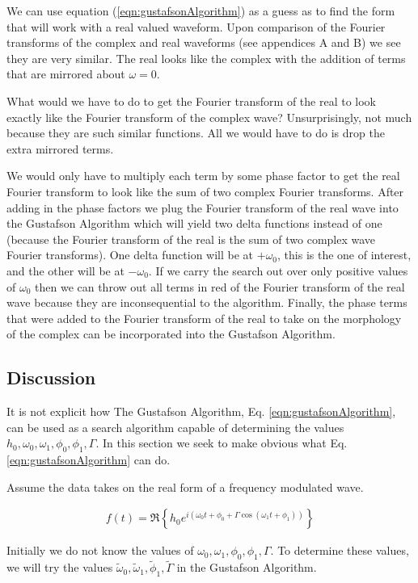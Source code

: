 \documentclass[onecolumn, groupedaddress, 10pt]{revtex4-1}
\begin{document}
We can use equation (\ref{eqn:gustafsonAlgorithm}) as a guess as to find the form that will work with a real valued waveform.  Upon comparison of the Fourier transforms of the complex and real waveforms (see appendices A and B) we see they are very similar.  The real looks like the complex with the addition of terms that are mirrored about $\omega=0$.

What would we have to do to get the Fourier transform of the real to look exactly like the Fourier transform of the complex wave?  Unsurprisingly, not much because they are such similar functions.  All we would have to do is drop the extra mirrored terms.


We would only have to multiply each term by some phase factor to get the real Fourier transform to look like the sum of two complex Fourier transforms.  After adding in the phase factors we plug the Fourier transform of the real wave into the Gustafson Algorithm which will yield two delta functions instead of one (because the Fourier transform of the real is the sum of two complex wave Fourier transforms).  One delta function will be at $+\omega_0$, this is the one of interest, and the other will be at $-\omega_0$. If we carry the search out over only positive values of $\omega_0$ then we can throw out all terms in red of the Fourier transform of the real wave because they are inconsequential to the algorithm.  Finally, the phase terms that were added to the Fourier transform of the real to take on the morphology of the complex can be incorporated into the Gustafson Algorithm.


\subsection{Discussion}
It is not explicit how The Gustafson Algorithm, Eq. \ref{eqn:gustafsonAlgorithm}, can be used as a search algorithm capable of determining the values $h_0, \omega_0, \omega_1, \phi_0, \phi_1, \Gamma$.  In this section we seek to make obvious what Eq. \ref{eqn:gustafsonAlgorithm} can do.  

Assume the data takes on the real form of a frequency modulated wave.

\begin{align}
\label{eqn:realData}
f(t) = \Re \left\{ h_0 e^{i\left( \omega_0 t + \phi_0 + \Gamma \cos( \omega_1 t + \phi_1 ) \right)} \right\}
\end{align}

Initially we do not know the values of $\omega_0, \omega_1, \phi_0, \phi_1, \Gamma$.  To determine these values, we will try the values $\widetilde{\omega}_0, \widetilde{\omega}_1, \widetilde{\phi}_1, \widetilde{\Gamma}$ in the Gustafson Algorithm.
\end{document}
